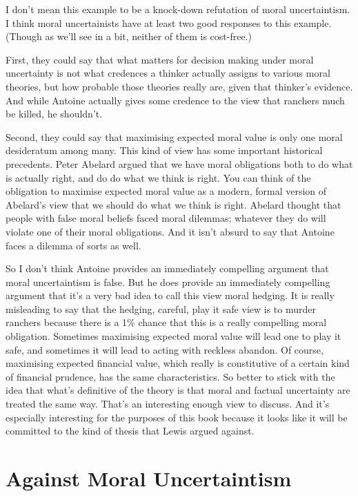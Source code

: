 \documentclass[11pt,]{book}
\begin{document}
I don't mean this example to be a knock-down refutation of moral uncertaintism. I think moral uncertainists have at least two good responses to this example. (Though as we'll see in a bit, neither of them is cost-free.)

First, they could say that what matters for decision making under moral uncertainty is not what credences a thinker actually assigns to various moral theories, but how probable those theories really are, given that thinker's evidence. And while Antoine actually gives some credence to the view that ranchers much be killed, he shouldn't.

Second, they could say that maximising expected moral value is only one moral desideratum among many. This kind of view has some important historical precedents. Peter Abelard argued that we have moral obligations both to do what is actually right, and do do what we think is right. You can think of the obligation to maximise expected moral value as a modern, formal version of Abelard's view that we should do what we think is right. Abelard thought that people with false moral beliefs faced moral dilemmas; whatever they do will violate one of their moral obligations. And it isn't absurd to say that Antoine faces a dilemma of sorts as well.

So I don't think Antoine provides an immediately compelling argument that moral uncertaintism is false. But he does provide an immediately compelling argument that it's a very bad idea to call this view moral hedging. It is really misleading to say that the hedging, careful, play it safe view is to murder ranchers because there is a 1\% chance that this is a really compelling moral obligation. Sometimes maximising expected moral value will lead one to play it safe, and sometimes it will lead to acting with reckless abandon. Of course, maximising expected financial value, which really is constitutive of a certain kind of financial prudence, has the same characteristics. So better to stick with the idea that what's definitive of the theory is that moral and factual uncertainty are treated the same way. That's an interesting enough view to discuss. And it's especially interesting for the purposes of this book because it looks like it will be committed to the kind of thesis that Lewis argued against.

\hypertarget{against-moral-uncertaintism}{%
\section{Against Moral Uncertaintism}\label{against-moral-uncertaintism}}
\end{document}
